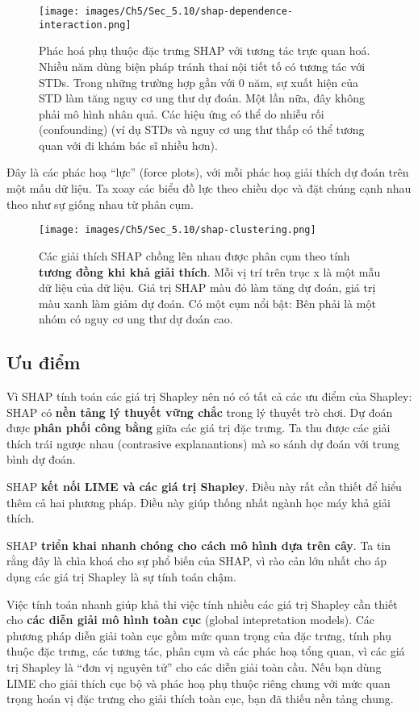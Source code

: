 \begin{enumerate}
\begin{figure*}[h!]
	\centering
	\texttt{[image: images/Ch5/Sec\_5.10/shap-dependence-interaction.png]}
	\label{fig:5_54}
	\caption{Phác hoá phụ thuộc đặc trưng SHAP với tương tác trực quan hoá. Nhiều năm dùng biện pháp tránh thai nội tiết tố có tương tác với STDs. Trong những trường hợp gần với $0$ năm, sự xuất hiện của STD làm tăng nguy cơ ung thư dự đoán. Một lần nữa, đây không phải mô hình nhân quả. Các hiệu ứng có thể do nhiễu rối (confounding) (ví dụ STDs và nguy cơ ung thư thấp có thể tương quan với đi khám bác sĩ nhiều hơn).}
\end{figure*}

Đây là các phác hoạ ``lực'' (force plots), với mỗi phác hoạ giải thích dự đoán trên một mấu dữ liệu. Ta xoay các biểu đồ lực theo chiều dọc và đặt chúng cạnh nhau theo như sự giống nhau từ phân cụm. 

\begin{figure*}[h!]
	\centering
	\texttt{[image: images/Ch5/Sec\_5.10/shap-clustering.png]}
	\label{fig:5_55}
	\caption{Các giải thích SHAP chồng lên nhau được phân cụm theo tính \textbf{tương đồng khi khả giải thích}. Mỗi vị trí trên trục x là một mẫu dữ liệu của dữ liệu. Giá trị SHAP màu đỏ làm tăng dự đoán, giá trị màu xanh làm giảm dự đoán. Có một cụm nổi bật: Bên phải là một nhóm có nguy cơ ung thư dự đoán cao.}
\end{figure*}
\subsection{Ưu điểm}

Vì SHAP tính toán các giá trị Shapley nên nó có tất cả các ưu điểm của Shapley: SHAP có \textbf{nền tảng lý thuyết vững chắc} trong lý thuyết trò chơi. Dự đoán được \textbf{ phân phối công bằng} giữa các giá trị đặc trưng. Ta thu được các giải thích trái ngược nhau (contrasive explanantions) mà so sánh dự đoán với trung bình dự đoán. 

SHAP \textbf{kết nối LIME và các giá trị Shapley}. Điều này rất cần thiết để hiểu thêm cả hai phương pháp. Điều này giúp thống nhất ngành học máy khả giải thích.

SHAP \textbf{triển khai nhanh chóng cho cách mô hình dựa trên cây}. Ta tin rằng đây là chìa khoá cho sự phổ biến của SHAP, vì rào cản lớn nhất cho áp dụng các giá trị Shapley là sự tính toán chậm. 

Việc tính toán nhanh giúp khả thi việc tính nhiều các giá trị Shapley cần thiết cho \textbf{các diễn giải mô hình toàn cục} (global intepretation models). Các phương pháp diễn giải toàn cục gồm mức quan trọng của đặc trưng, tính phụ thuộc đặc trưng, các tương tác, phân cụm và các phác hoạ tổng quan, vì các giá trị Shapley là “đơn vị nguyên tử” cho các diễn giải toàn cầu. Nếu bạn dùng LIME cho giải thích cục bộ và phác hoạ phụ thuộc riêng chung với mức quan trọng hoán vị đặc trưng cho giải thích toàn cục, bạn đã thiếu nền tảng chung.


\end{enumerate}
